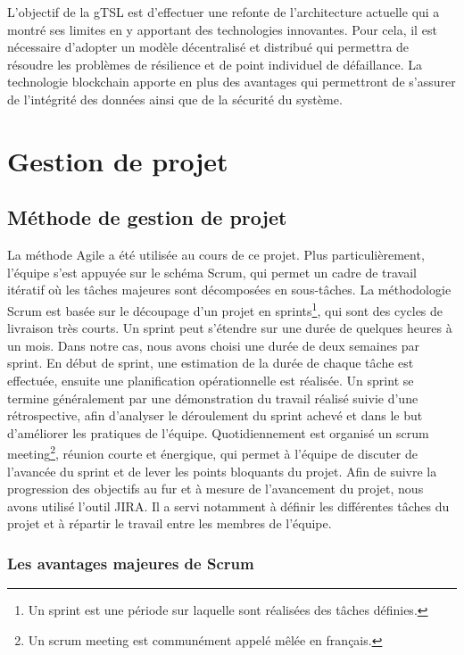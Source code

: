 \documentclass{tnreport}
\begin{document}
L'objectif de la gTSL est d'effectuer une refonte de l'architecture actuelle qui a montré ses limites en y apportant des technologies innovantes. Pour cela, il est nécessaire d'adopter un modèle décentralisé et distribué qui permettra de résoudre les problèmes de résilience et de point individuel de défaillance. La technologie blockchain apporte en plus des avantages qui permettront de s'assurer de l'intégrité des données ainsi que de la sécurité du système.

\section{Gestion de projet}

\subsection{Méthode de gestion de projet}

La méthode Agile a été utilisée au cours de ce projet. 
Plus particulièrement, l'équipe s'est appuyée sur le schéma Scrum, qui permet un cadre de travail itératif où les tâches majeures sont décomposées en sous-tâches.
La méthodologie Scrum est basée sur le découpage d'un projet en sprints\footnote{Un sprint est une période sur laquelle sont réalisées des tâches définies.}, qui sont des cycles de livraison très courts.
Un sprint peut s'étendre sur une durée de quelques heures à un mois. 
Dans notre cas, nous avons choisi une durée de deux semaines par sprint.
En début de sprint, une estimation de la durée de chaque tâche est effectuée, ensuite une planification opérationnelle est réalisée.
Un sprint se termine généralement par une démonstration du travail réalisé suivie d'une rétrospective, afin d'analyser le déroulement du sprint achevé et dans le but d'améliorer les pratiques de l'équipe. 
Quotidiennement est organisé un scrum meeting\footnote{Un scrum meeting est communément appelé mêlée en français.}, réunion courte et énergique, qui permet à l'équipe de discuter de l'avancée du sprint et de lever les points bloquants du projet.
Afin de suivre la progression des objectifs au fur et à mesure de l’avancement du projet, nous avons utilisé l'outil JIRA. Il a servi notamment à définir les différentes tâches du projet et à répartir le travail entre les membres de l’équipe.

\subsubsection{Les avantages majeures de Scrum}
\end{document}
